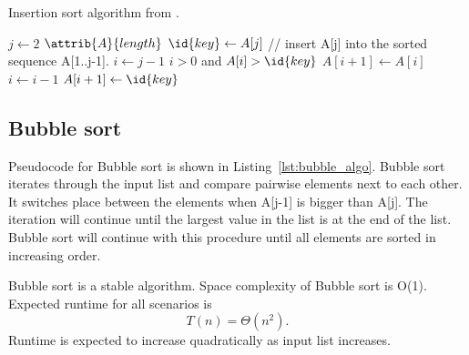 \documentclass[sigconf, nonacm, natbib, screen, balance=False]{acmart}
\begin{document}
\begin{listing}
  \caption{Insertion sort algorithm from \citet[Ch.~2.1]{CLRS_2009}.}
  \label{lst:insertion_algo}
  \begin{codebox}
    \li \For $j \gets 2$ \To $\attrib{A}{length}$
    \li \Do
    $\id{key} \gets A[j]$
    \li // insert A[j] into the sorted sequence A[1..j-1].
    \li     $i \gets j-1$
    \li      \While $i>0$ and $A[i] > \id{key}$
    \li      \Do
    $A[i+1] \gets A[i]$
    \li         $i \gets i-1$
    \End    
    \li       $A[i+1]\gets \id{key}$
    \End
  \end{codebox}
\end{listing}
\FloatBarrier




\subsection{Bubble sort }\label{sec:algo2}
Pseudocode for Bubble sort is shown in Listing~\ref{lst:bubble_algo}. Bubble sort iterates through the input list and compare pairwise elements next to each other. It switches place between the elements when A[j-1] is bigger than A[j]. The iteration will continue until the largest value in the list is at the end of the list. Bubble sort will continue with this procedure until all elements are sorted in increasing order. \citet{bubble_sort}

Bubble sort is a stable algorithm. Space complexity of Bubble sort is O(1). Expected runtime for all scenarios is 
\begin{equation*}
T(n)=\Theta(n^2).
\end{equation*}
Runtime is expected to increase quadratically as input list increases. \citet{bubble_sort}
\end{document}
